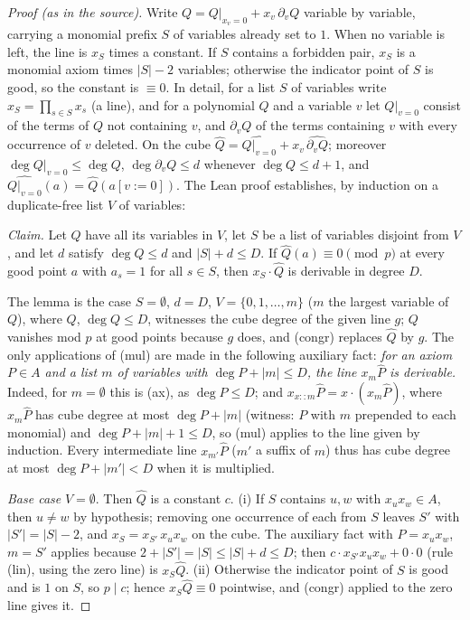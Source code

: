 \begin{proof}[Proof (as in the source)]
Write $Q=Q|_{x_v=0}+x_v\,\partial_vQ$ variable by variable, carrying a monomial
prefix $S$ of variables already set to $1$.  When no variable is left, the line is
$x_S$ times a constant.  If $S$ contains a forbidden pair, $x_S$ is a monomial axiom
times $|S|-2$ variables; otherwise the indicator point of $S$ is good, so the
constant is $\equiv0$.  
In detail, for a list $S$ of variables write $x_S=\prod_{s\in S}x_s$ (a line), and for a
polynomial $Q$ and a variable $v$ let $Q|_{v=0}$ consist of the terms of $Q$ not containing
$v$, and $\partial_vQ$ of the terms containing $v$ with every occurrence of $v$ deleted.  On
the cube $\hat Q=\widehat{Q|_{v=0}}+x_v\,\widehat{\partial_vQ}$; moreover
$\deg Q|_{v=0}\le\deg Q$, $\deg\partial_vQ\le d$ whenever $\deg Q\le d+1$, and
$\widehat{Q|_{v=0}}(a)=\hat Q(a[v:=0])$.
The Lean proof establishes, by induction on a duplicate-free list $V$ of variables:

\smallskip\noindent\emph{Claim.}  Let $Q$ have all its variables in $V$, let $S$ be a list of
variables disjoint from $V$, and let $d$ satisfy $\deg Q\le d$ and $|S|+d\le D$.  If
$\hat Q(a)\equiv0\pmod p$ at every good point $a$ with $a_s=1$ for all $s\in S$, then
$x_S\cdot\hat Q$ is derivable in degree $D$.

\smallskip
The lemma is the case $S=\emptyset$, $d=D$, $V=\{0,1,\dots,m\}$ ($m$ the largest variable of
$Q$), where $Q$, $\deg Q\le D$, witnesses the cube degree of the given line $g$; $Q$ vanishes
mod $p$ at good points because $g$ does, and (congr) replaces $\hat Q$ by
$g$.
The only applications of (mul) are made in the following auxiliary fact: \emph{for an
axiom $P\in A$ and a list $m$ of variables with $\deg P+|m|\le D$, the line $x_m\hat P$ is
derivable.}  Indeed, for $m=\emptyset$ this is (ax), as
$\deg P\le D$; and $x_{x::m}\hat P=x\cdot(x_m\hat P)$, where $x_m\hat P$ has cube degree at
most $\deg P+|m|$ (witness: $P$ with $m$ prepended to each monomial) and
$\deg P+|m|+1\le D$, so (mul) applies to the line given by induction.  Every intermediate
line $x_{m'}\hat P$ ($m'$ a suffix of $m$) thus has cube degree at most
$\deg P+|m'|<D$ when it is multiplied.

\emph{Base case} $V=\emptyset$.  Then $\hat Q$ is a constant $c$.  (i) If $S$ contains $u,w$
with $x_ux_w\in A$, then $u\ne w$ by hypothesis; removing one occurrence of each from $S$
leaves $S'$ with $|S'|=|S|-2$, and $x_S=x_{S'}\,x_ux_w$ on the cube.  The auxiliary fact with
$P=x_ux_w$, $m=S'$ applies because $2+|S'|=|S|\le|S|+d\le D$; then
$c\cdot x_{S'}x_ux_w+0\cdot0$ (rule (lin), using the zero line) is $x_S\hat Q$.  (ii) Otherwise
the indicator point of $S$ is good and is $1$ on $S$, so $p\mid c$; hence $x_S\hat Q\equiv0$
pointwise, and (congr) applied to the zero line gives it.


\end{proof}

